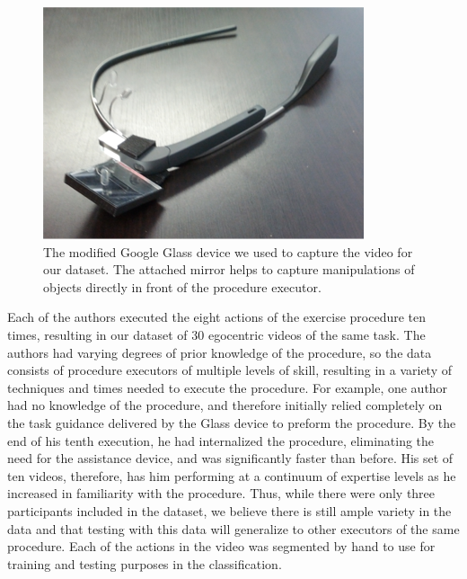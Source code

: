 \documentclass[10pt,twocolumn,letterpaper]{article}
\begin{document}
\begin{figure}[!b]
    \centering
    \includegraphics[width=\columnwidth]{fig/glass.png}
    \caption{The modified Google Glass device we used to capture the video for our dataset. The attached mirror helps to capture manipulations of objects directly in front of the procedure executor.}
    \label{fig:glass}
\end{figure}

Each of the authors executed the eight actions of the exercise procedure ten times, resulting in our dataset of 30 egocentric videos of the same task. The authors had varying degrees of prior knowledge of the procedure, so the data consists of procedure executors of multiple levels of skill, resulting in a variety of techniques and times needed to execute the procedure. For example, one author had no knowledge of the procedure, and therefore initially relied completely on the task guidance delivered by the Glass device to preform the procedure. By the end of his tenth execution, he had internalized the procedure, eliminating the need for the assistance device, and was significantly faster than before. His set of ten videos, therefore, has him performing at a continuum of expertise levels as he increased in familiarity with the procedure. Thus, while there were only three participants included in the dataset, we believe there is still ample variety in the data and that testing with this data will generalize to other executors of the same procedure. Each of the actions in the video was segmented by hand to use for training and testing purposes in the classification.
\end{document}
